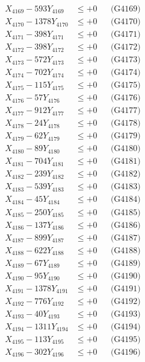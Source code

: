 \documentclass[a4paper,10pt]{article}
\begin{document}
{\begin{align}
X_{4169} - 593Y_{4169} &\leq +0 && \text{(G4169)} \\
X_{4170} - 1378Y_{4170} &\leq +0 && \text{(G4170)} \\
\allowbreak
X_{4171} - 398Y_{4171} &\leq +0 && \text{(G4171)} \\
X_{4172} - 398Y_{4172} &\leq +0 && \text{(G4172)} \\
X_{4173} - 572Y_{4173} &\leq +0 && \text{(G4173)} \\
X_{4174} - 702Y_{4174} &\leq +0 && \text{(G4174)} \\
X_{4175} - 115Y_{4175} &\leq +0 && \text{(G4175)} \\
X_{4176} - 57Y_{4176} &\leq +0 && \text{(G4176)} \\
X_{4177} - 912Y_{4177} &\leq +0 && \text{(G4177)} \\
X_{4178} - 24Y_{4178} &\leq +0 && \text{(G4178)} \\
X_{4179} - 62Y_{4179} &\leq +0 && \text{(G4179)} \\
X_{4180} - 89Y_{4180} &\leq +0 && \text{(G4180)} \\
\allowbreak
X_{4181} - 704Y_{4181} &\leq +0 && \text{(G4181)} \\
X_{4182} - 239Y_{4182} &\leq +0 && \text{(G4182)} \\
X_{4183} - 539Y_{4183} &\leq +0 && \text{(G4183)} \\
X_{4184} - 45Y_{4184} &\leq +0 && \text{(G4184)} \\
X_{4185} - 250Y_{4185} &\leq +0 && \text{(G4185)} \\
X_{4186} - 137Y_{4186} &\leq +0 && \text{(G4186)} \\
X_{4187} - 899Y_{4187} &\leq +0 && \text{(G4187)} \\
X_{4188} - 622Y_{4188} &\leq +0 && \text{(G4188)} \\
X_{4189} - 67Y_{4189} &\leq +0 && \text{(G4189)} \\
X_{4190} - 95Y_{4190} &\leq +0 && \text{(G4190)} \\
\allowbreak
X_{4191} - 1378Y_{4191} &\leq +0 && \text{(G4191)} \\
X_{4192} - 776Y_{4192} &\leq +0 && \text{(G4192)} \\
X_{4193} - 40Y_{4193} &\leq +0 && \text{(G4193)} \\
X_{4194} - 1311Y_{4194} &\leq +0 && \text{(G4194)} \\
X_{4195} - 113Y_{4195} &\leq +0 && \text{(G4195)} \\
X_{4196} - 302Y_{4196} &\leq +0 && \text{(G4196)} \\

\end{align}}
\end{document}
